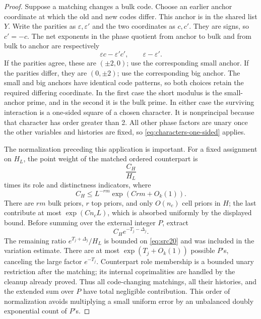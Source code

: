 \begin{proof}
Suppose a matching changes a bulk code. Choose an earlier
anchor coordinate at which the old and new codes differ.
This anchor is in the shared list \(Y\). Write the parities
as \(\varepsilon,\varepsilon'\) and the two coordinates as
\(c,c'\). They are signs, so \(c'=-c\).
The net exponents in the phase quotient from anchor to bulk
and from bulk to anchor are respectively
\[
 \varepsilon c-\varepsilon'c',
 \qquad \varepsilon-\varepsilon'.
\]
If the parities agree, these are \((\pm2,0)\);
use the corresponding small anchor. If the parities differ,
they are \((0,\pm2)\); use the corresponding big anchor.
The small and big anchors have identical code patterns,
so both choices retain the required differing coordinate.
In the first case the short modulus is the small-anchor
prime, and in the second it is the bulk prime.
In either case the surviving interaction is a one-sided
square of a chosen character. It is nonprincipal because
that character has order greater than 2.
All other phase factors are unary once the other variables
and histories are fixed, so
\eqref{eq:characters-one-sided} applies.

The normalization preceding this application is important.
For a fixed assignment on \(H_L\), the point weight of the
matched ordered counterpart is
\[
 \frac{C_H}{H_L}
\]
times its role and distinctness indicators, where
\[
 C_H\le L^{-rm}\exp(Crm+O_k(1)).
\]
There are \(rm\) bulk priors, \(r\) top priors, and only
\(O(n_c)\) cell priors in \(H\); the last contribute
at most \(\exp(Cn_cL)\), which is absorbed uniformly
by the displayed bound. Before summing over the external
integer \(P\), extract
\[
 C_H e^{-T_j-\Delta_j}.
\]
The remaining ratio \(e^{T_j+\Delta_j}/H_L\) is bounded
on \eqref{eq:src20} and was included in the variation
estimate. There are at most \(\exp(T_j+O_k(1))\)
possible \(P\)'s, canceling the large factor \(e^{-T_j}\).
Counterpart role membership is a bounded unary restriction
after the matching; its internal coprimalities are handled
by the cleanup already proved. Thus all code-changing
matchings, all their histories, and the extended sum over
\(P\) have total negligible contribution. This order of
normalization avoids multiplying a small uniform error
by an unbalanced doubly exponential count of \(P\)'s.


\end{proof}
